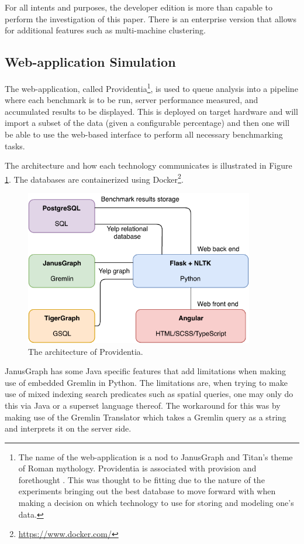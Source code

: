 For all intents and purposes, the developer edition is more than capable to perform the investigation of this paper. There is an enterprise version that allows for additional features such as multi-machine clustering.

\subsection{Web-application Simulation}
The web-application, called Providentia\footnote{The name of the web-application is a nod to JanusGraph and Titan's theme of Roman mythology. Providentia is associated with provision and forethought \cite{providentia-meaning}. This was thought to be fitting due to the nature of the experiments bringing out the best database to move forward with when making a decision on which technology to use for storing and modeling one's data.}, is used to queue analysis into a pipeline where each benchmark is to be run, server performance measured, and accumulated results to be displayed. This is deployed on target hardware and will import a subset of the data (given a configurable percentage) and then one will be able to use the web-based interface to perform all necessary benchmarking tasks.

The architecture and how each technology communicates is illustrated in Figure \ref{fig:providentia-architecture}. The databases are containerized using Docker\footnote{\url{https://www.docker.com/}}.

\begin{figure}[h!]
    \centering
    \includegraphics[width=10cm]{img/providentia-architecture.pdf}
    \caption{The architecture of Providentia.}
    \label{fig:providentia-architecture}
\end{figure}

JanusGraph has some Java specific features that add limitations when making use of embedded Gremlin in Python. The limitations are, when trying to make use of mixed indexing search predicates such as spatial queries, one may only do this via Java or a superset language thereof. The workaround for this was by making use of the Gremlin Translator which takes a Gremlin query as a string and interprets it on the server side.

